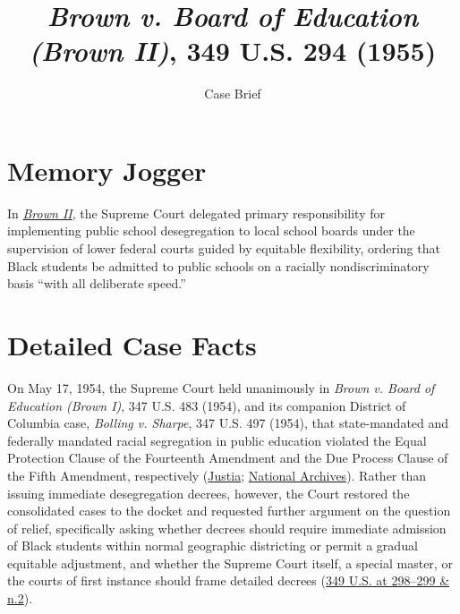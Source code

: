 \documentclass[12pt]{article}
\title{\textit{Brown v. Board of Education (Brown II)}, 349 U.S. 294 (1955)}
\subtitle{Case Brief}
\author{}
\date{}
\begin{document}
\maketitle

\section{Memory Jogger}

In \href{https://www.courtlistener.com/opinion/105312/brown-v-board-of-education/}{\textit{Brown II}}, the Supreme Court delegated primary responsibility for implementing public school desegregation to local school boards under the supervision of lower federal courts guided by equitable flexibility, ordering that Black students be admitted to public schools on a racially nondiscriminatory basis ``with all deliberate speed.''

\section{Detailed Case Facts}

On May 17, 1954, the Supreme Court held unanimously in \textit{Brown v. Board of Education (Brown I)}, 347 U.S. 483 (1954), and its companion District of Columbia case, \textit{Bolling v. Sharpe}, 347 U.S. 497 (1954), that state-mandated and federally mandated racial segregation in public education violated the Equal Protection Clause of the Fourteenth Amendment and the Due Process Clause of the Fifth Amendment, respectively (\href{https://supreme.justia.com/cases/federal/us/349/294/}{Justia}; \href{https://www.archives.gov/education/lessons/brown-v-board}{National Archives}). Rather than issuing immediate desegregation decrees, however, the Court restored the consolidated cases to the docket and requested further argument on the question of relief, specifically asking whether decrees should require immediate admission of Black students within normal geographic districting or permit a gradual equitable adjustment, and whether the Supreme Court itself, a special master, or the courts of first instance should frame detailed decrees (\href{https://supreme.justia.com/cases/federal/us/349/294/}{349 U.S. at 298--299 \& n.2}).
\end{document}
